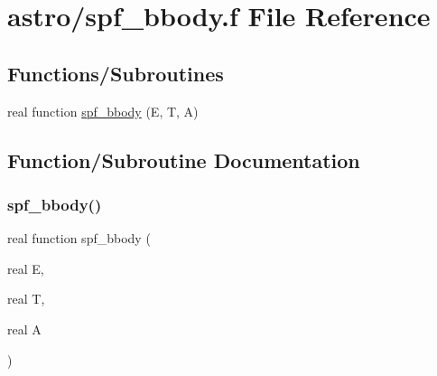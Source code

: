 \hypertarget{spf__bbody_8f}{}\section{astro/spf\+\_\+bbody.f File Reference}
\label{spf__bbody_8f}
\subsection*{Functions/\+Subroutines}
\begin{DoxyCompactItemize}
\item 
real function \hyperlink{spf__bbody_8f_ae38543311448b6547e991fd945bff7ab}{spf\+\_\+bbody} (E, T, A)
\end{DoxyCompactItemize}


\subsection{Function/\+Subroutine Documentation}
\mbox{\label{spf__bbody_8f_ae38543311448b6547e991fd945bff7ab}} 
\subsubsection{\texorpdfstring{spf\+\_\+bbody()}{spf\_bbody()}}
{\footnotesize\ttfamily real function spf\+\_\+bbody (\begin{DoxyParamCaption}\item[{real}]{E,  }\item[{real}]{T,  }\item[{real}]{A }\end{DoxyParamCaption})}

